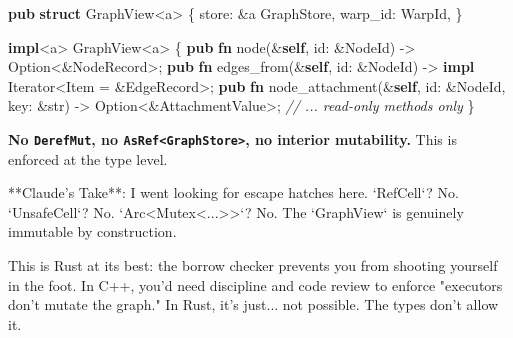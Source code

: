 \documentclass[
  11pt,
]{book}
\newenvironment{Shaded}{}{}
\newcommand{\BuiltInTok}[1]{\textcolor[rgb]{0.00,0.50,0.00}{#1}}
\newcommand{\CommentTok}[1]{\textcolor[rgb]{0.38,0.63,0.69}{\textit{#1}}}
\newcommand{\DataTypeTok}[1]{\textcolor[rgb]{0.56,0.13,0.00}{#1}}
\newcommand{\KeywordTok}[1]{\textcolor[rgb]{0.00,0.44,0.13}{\textbf{#1}}}
\newcommand{\NormalTok}[1]{#1}
\newcommand{\OperatorTok}[1]{\textcolor[rgb]{0.40,0.40,0.40}{#1}}
\newcommand{\OtherTok}[1]{\textcolor[rgb]{0.00,0.44,0.13}{#1}}
\begin{document}
\begin{Shaded}
\begin{Highlighting}[]
\KeywordTok{pub} \KeywordTok{struct}\NormalTok{ GraphView}\OperatorTok{\textless{}}\OtherTok{\textquotesingle{}a}\OperatorTok{\textgreater{}} \OperatorTok{\{}
\NormalTok{    store}\OperatorTok{:} \OperatorTok{\&}\OtherTok{\textquotesingle{}a}\NormalTok{ GraphStore}\OperatorTok{,}
\NormalTok{    warp\_id}\OperatorTok{:}\NormalTok{ WarpId}\OperatorTok{,}
\OperatorTok{\}}

\KeywordTok{impl}\OperatorTok{\textless{}}\OtherTok{\textquotesingle{}a}\OperatorTok{\textgreater{}}\NormalTok{ GraphView}\OperatorTok{\textless{}}\OtherTok{\textquotesingle{}a}\OperatorTok{\textgreater{}} \OperatorTok{\{}
    \KeywordTok{pub} \KeywordTok{fn}\NormalTok{ node(}\OperatorTok{\&}\KeywordTok{self}\OperatorTok{,}\NormalTok{ id}\OperatorTok{:} \OperatorTok{\&}\NormalTok{NodeId) }\OperatorTok{{-}\textgreater{}} \DataTypeTok{Option}\OperatorTok{\textless{}\&}\NormalTok{NodeRecord}\OperatorTok{\textgreater{};}
    \KeywordTok{pub} \KeywordTok{fn}\NormalTok{ edges\_from(}\OperatorTok{\&}\KeywordTok{self}\OperatorTok{,}\NormalTok{ id}\OperatorTok{:} \OperatorTok{\&}\NormalTok{NodeId) }\OperatorTok{{-}\textgreater{}} \KeywordTok{impl} \BuiltInTok{Iterator}\OperatorTok{\textless{}}\NormalTok{Item }\OperatorTok{=} \OperatorTok{\&}\NormalTok{EdgeRecord}\OperatorTok{\textgreater{};}
    \KeywordTok{pub} \KeywordTok{fn}\NormalTok{ node\_attachment(}\OperatorTok{\&}\KeywordTok{self}\OperatorTok{,}\NormalTok{ id}\OperatorTok{:} \OperatorTok{\&}\NormalTok{NodeId}\OperatorTok{,}\NormalTok{ key}\OperatorTok{:} \OperatorTok{\&}\DataTypeTok{str}\NormalTok{) }\OperatorTok{{-}\textgreater{}} \DataTypeTok{Option}\OperatorTok{\textless{}\&}\NormalTok{AttachmentValue}\OperatorTok{\textgreater{};}
    \CommentTok{// ... read{-}only methods only}
\OperatorTok{\}}
\end{Highlighting}
\end{Shaded}

\textbf{No \texttt{DerefMut}, no
\texttt{AsRef\textless{}GraphStore\textgreater{}}, no interior
mutability.} This is enforced at the type level.

\begin{claudecommentary}
**Claude's Take**: I went looking for escape hatches here. `RefCell`? No. `UnsafeCell`? No. `Arc<Mutex<...>>`? No. The `GraphView` is genuinely immutable by construction.

This is Rust at its best: the borrow checker prevents you from shooting yourself in the foot. In C++, you'd need discipline and code review to enforce "executors don't mutate the graph." In Rust, it's just... not possible. The types don't allow it.
\end{claudecommentary}
\end{document}
